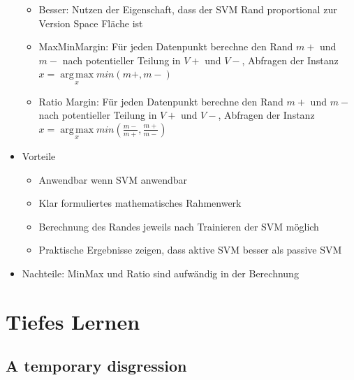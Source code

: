 \documentclass[paper=a4, fontsize=11pt]{scrartcl} %
\numberwithin{equation}{section} %
\numberwithin{figure}{section} %
\numberwithin{table}{section} %
\DeclareMathOperator*{\argmax}{arg\,max}
\begin{document}
\begin{itemize}
\begin{itemize}
\item Besser: Nutzen der Eigenschaft, dass der SVM Rand proportional zur Version Space Fläche ist 
\item MaxMinMargin: Für jeden Datenpunkt berechne den Rand $m+$ und $m-$ nach potentieller Teilung in $V+$ und $V-$, Abfragen der Instanz $x = \argmax\limits_x min(m+,m-)$
\item Ratio Margin: Für jeden Datenpunkt berechne den Rand $m+$ und $m-$ nach potentieller Teilung in $V+$ und $V-$, Abfragen der Instanz $x = \argmax\limits_x min(\frac{m-}{m+},\frac{m+}{m-})$
\end{itemize}
\item Vorteile
\begin{itemize}
\item Anwendbar wenn SVM anwendbar
\item Klar formuliertes mathematisches Rahmenwerk
\item Berechnung des Randes jeweils nach Trainieren der SVM möglich
\item Praktische Ergebnisse zeigen, dass aktive SVM besser als passive SVM
\end{itemize}
\item Nachteile: MinMax und Ratio sind aufwändig in der Berechnung
\end{itemize}

\section{Tiefes Lernen}

\subsection{A temporary disgression}
\end{document}
